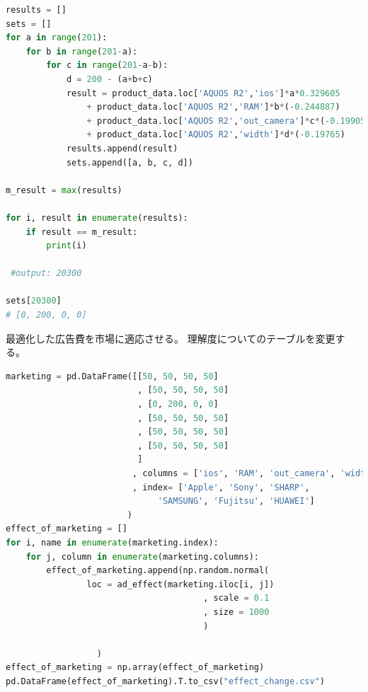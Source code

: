 \documentclass{jarticle}
\begin{document}
\begin{lstlisting}[caption=広告費用の離散最適化, frame=single, language=python]
results = []
sets = []
for a in range(201):
    for b in range(201-a):
        for c in range(201-a-b):
            d = 200 - (a+b+c)
            result = product_data.loc['AQUOS R2','ios']*a*0.329605
            	+ product_data.loc['AQUOS R2','RAM']*b*(-0.244887)
            	+ product_data.loc['AQUOS R2','out_camera']*c*(-0.19905)
            	+ product_data.loc['AQUOS R2','width']*d*(-0.19765)
            results.append(result)
            sets.append([a, b, c, d])
            
m_result = max(results)

for i, result in enumerate(results):
    if result == m_result:
        print(i)
 
 #output: 20300
        
sets[20300]
# [0, 200, 0, 0]
\end{lstlisting}

最適化した広告費を市場に適応させる。
理解度についてのテーブルを変更する。

\begin{lstlisting}[caption=広告費を変更した各製品の属性ごとの理解度, frame=single, language=python]
marketing = pd.DataFrame([[50, 50, 50, 50]
                          , [50, 50, 50, 50]
                          , [0, 200, 0, 0]
                          , [50, 50, 50, 50]
                          , [50, 50, 50, 50]
                          , [50, 50, 50, 50]
                          ]
                         , columns = ['ios', 'RAM', 'out_camera', 'width']
                         , index= ['Apple', 'Sony', 'SHARP',
                              'SAMSUNG', 'Fujitsu', 'HUAWEI']
                        )
effect_of_marketing = []
for i, name in enumerate(marketing.index):
    for j, column in enumerate(marketing.columns):
        effect_of_marketing.append(np.random.normal(
                loc = ad_effect(marketing.iloc[i, j])
                                       , scale = 0.1
                                       , size = 1000
                                       )
                      
                  )
effect_of_marketing = np.array(effect_of_marketing)
pd.DataFrame(effect_of_marketing).T.to_csv("effect_change.csv")
\end{lstlisting}
\end{document}
